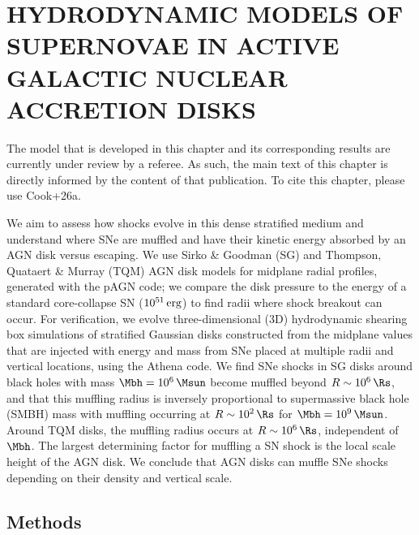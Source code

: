 \section{\texorpdfstring{\MakeUppercase{hydrodynamic models of supernovae in active galactic nuclear accretion disks}}{hydrodynamic models of supernovae in active galactic nuclear accretion disks}}
\label{sec:sn-hydrodynamics}


\par The model that is developed in this chapter and its corresponding results are currently under review by a referee.
As such, the main text of this chapter is directly informed by the content of that publication.
To cite this chapter, please use Cook+26a.

We aim to assess how shocks evolve in this dense stratified medium and understand where SNe are muffled and have their kinetic energy absorbed by an AGN disk versus escaping.
We use Sirko \& Goodman (SG) and Thompson, Quataert \& Murray (TQM) AGN disk models for midplane radial profiles, generated with the pAGN code; we compare the disk pressure to the energy of a standard core-collapse SN ($10^{51}\,{\rm erg}$) to find radii where shock breakout can occur.
For verification, we evolve three-dimensional (3D) hydrodynamic shearing box simulations of stratified Gaussian disks constructed from the midplane values that are injected with energy and mass from SNe placed at multiple radii and vertical locations, using the Athena code.
We find SNe shocks in SG disks around black holes with mass $\Mbh=10^6\,\Msun$ become muffled beyond $R\sim10^6\,\Rs$, and that this muffling radius is inversely proportional to supermassive black hole (SMBH) mass with muffling occurring at $R\sim10^2\,\Rs$ for $\Mbh=10^9\,\Msun$.
Around TQM disks, the muffling radius occurs at $R\sim10^6\,\Rs$, independent of $\Mbh$.
The largest determining factor for muffling a SN shock is the local scale height of the AGN disk.
We conclude that AGN disks can muffle SNe shocks depending on their density and vertical scale.


\subsection{Methods}
\label{sec:methods-ch3}




